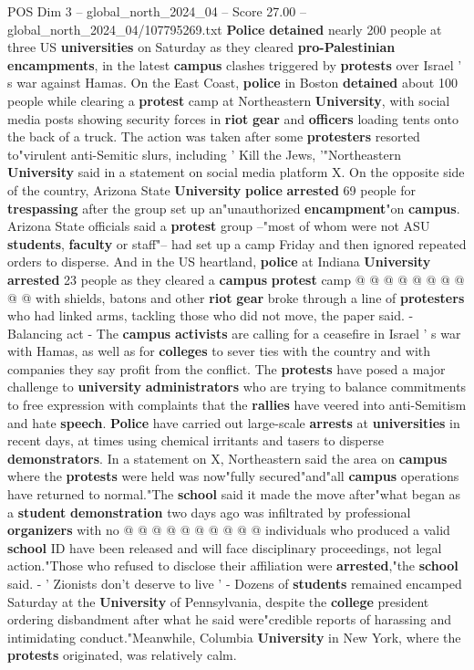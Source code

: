 \begin{textsample}{POS Dim 3 – global\_north\_2024\_04 – Score 27.00 – global\_north\_2024\_04/107795269.txt}  \label{ex:f3_pos_073}
\textbf{Police} \textbf{detained} nearly 200 people at three US \textbf{universities} on Saturday as they cleared \textbf{pro-Palestinian} \textbf{encampments}, in the latest \textbf{campus} clashes triggered by \textbf{protests} over Israel ' s war against Hamas.
On the East Coast, \textbf{police} in Boston \textbf{detained} about 100 people while clearing a \textbf{protest} camp at Northeastern \textbf{University}, with social media posts showing security forces in \textbf{riot} \textbf{gear} and \textbf{officers} loading tents onto the back of a truck.
The action was taken after some \textbf{protesters} resorted to"virulent anti-Semitic slurs, including ' Kill the Jews, '"Northeastern \textbf{University} said in a statement on social media platform X.
On the opposite side of the country, Arizona State \textbf{University} \textbf{police} \textbf{arrested} 69 people for \textbf{trespassing} after the group set up an"unauthorized \textbf{encampment}"on \textbf{campus}.
Arizona State officials said a \textbf{protest} group --"most of whom were not ASU \textbf{students}, \textbf{faculty} or staff"-- had set up a camp Friday and then ignored repeated orders to disperse.
And in the US heartland, \textbf{police} at Indiana \textbf{University} \textbf{arrested} 23 people as they cleared a \textbf{campus} \textbf{protest} camp @ @ @ @ @ @ @ @ @ @ with shields, batons and other \textbf{riot} \textbf{gear} broke through a line of \textbf{protesters} who had linked arms, tackling those who did not move, the paper said. - Balancing act - The \textbf{campus} \textbf{activists} are calling for a ceasefire in Israel ' s war with Hamas, as well as for \textbf{colleges} to sever ties with the country and with companies they say profit from the conflict.
The \textbf{protests} have posed a major challenge to \textbf{university} \textbf{administrators} who are trying to balance commitments to free expression with complaints that the \textbf{rallies} have veered into anti-Semitism and hate \textbf{speech}. \textbf{Police} have carried out large-scale \textbf{arrests} at \textbf{universities} in recent days, at times using chemical irritants and tasers to disperse \textbf{demonstrators}.
In a statement on X, Northeastern said the area on \textbf{campus} where the \textbf{protests} were held was now"fully secured"and"all \textbf{campus} operations have returned to normal."The \textbf{school} said it made the move after"what began as a \textbf{student} \textbf{demonstration} two days ago was infiltrated by professional \textbf{organizers} with no @ @ @ @ @ @ @ @ @ @ individuals who produced a valid \textbf{school} ID have been released and will face disciplinary proceedings, not legal action."Those who refused to disclose their affiliation were \textbf{arrested},"the \textbf{school} said. - ' Zionists don't deserve to live ' - Dozens of \textbf{students} remained encamped Saturday at the \textbf{University} of Pennsylvania, despite the \textbf{college} president ordering disbandment after what he said were"credible reports of harassing and intimidating conduct."Meanwhile, Columbia \textbf{University} in New York, where the \textbf{protests} originated, was relatively calm.

\end{textsample}
